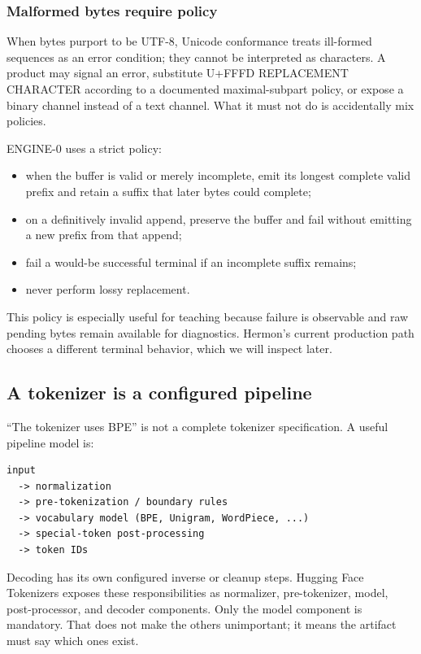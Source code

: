 \documentclass[
  10pt,
]{article}
\providecommand{\tightlist}{%
  \setlength{\itemsep}{0pt}\setlength{\parskip}{0pt}}
\begin{document}
\subsubsection{Malformed bytes require
policy}\label{malformed-bytes-require-policy}

When bytes purport to be UTF-8, Unicode conformance treats ill-formed
sequences as an error condition; they cannot be interpreted as
characters. A product may signal an error, substitute U+FFFD REPLACEMENT
CHARACTER according to a documented maximal-subpart policy, or expose a
binary channel instead of a text channel. What it must not do is
accidentally mix policies.

ENGINE-0 uses a strict policy:

\begin{itemize}
\tightlist
\item
  when the buffer is valid or merely incomplete, emit its longest
  complete valid prefix and retain a suffix that later bytes could
  complete;
\item
  on a definitively invalid append, preserve the buffer and fail without
  emitting a new prefix from that append;
\item
  fail a would-be successful terminal if an incomplete suffix remains;
\item
  never perform lossy replacement.
\end{itemize}

This policy is especially useful for teaching because failure is
observable and raw pending bytes remain available for diagnostics.
Hermon's current production path chooses a different terminal behavior,
which we will inspect later.

\subsection{A tokenizer is a configured
pipeline}\label{a-tokenizer-is-a-configured-pipeline}

``The tokenizer uses BPE'' is not a complete tokenizer specification. A
useful pipeline model is:

\begin{verbatim}
input
  -> normalization
  -> pre-tokenization / boundary rules
  -> vocabulary model (BPE, Unigram, WordPiece, ...)
  -> special-token post-processing
  -> token IDs
\end{verbatim}

Decoding has its own configured inverse or cleanup steps. Hugging Face
Tokenizers exposes these responsibilities as normalizer, pre-tokenizer,
model, post-processor, and decoder components. Only the model component
is mandatory. That does not make the others unimportant; it means the
artifact must say which ones exist.
\end{document}
